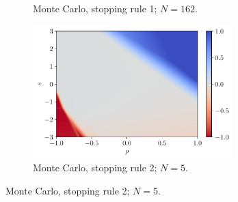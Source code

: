 \documentclass[a4paper, 12pt]{article}
\begin{document}
\begin{figure}[H]
\begin{subfigure}{0.49\textwidth}
            \caption{Monte Carlo, stopping rule 1; $N = 162$.}
        \end{subfigure}
        \hfill
        \begin{subfigure}{0.49\textwidth}
            \centering
            \includegraphics[width=0.85\textwidth]{resources/pdf/4_montecarlo_2_MLP_q_+4.pdf}
            \caption{Monte Carlo, stopping rule 2; $N = 5$.}
        \end{subfigure}
        \label{fig:qn.mlp.plus.4}
    \end{figure}
    
\end{document}
